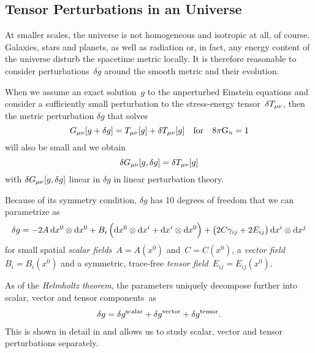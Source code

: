 \documentclass[12pt,parskip=half]{scrreprt}
\newcommand{\todocheck}[1]{\todo[color=blue!40]{#1}}
\begin{document}
\subsection{Tensor Perturbations in an \FLRW Universe}\label{sec:perturb}

At smaller scales, the universe is not homogeneous and isotropic at all, of course. Galaxies, stars and planets, as well as radiation or, in fact, any energy content of the universe disturb the spacetime metric locally. It is therefore reasonable to consider perturbations~\(\delta g\) around the smooth \FLRW metric and their evolution.

When we assume an exact solution~\(g\) to the unperturbed Einstein equations and consider a sufficiently small perturbation to the stress-energy tensor~\(\delta T_{\mu \nu}\), then the metric perturbation \(\delta g\) that solves
\begin{equation}
	G_{\mu \nu}[g + \delta g] = T_{\mu \nu}[g] + \delta T_{\mu \nu}[g] \quad \text{for} \quad 8 \pi \mathrm{G}_\textnormal{\tiny{N}} = 1
\end{equation}
will also be small  and we obtain
\begin{equation}\label{eq:perturbed_einstein_eqns}
	\delta G_{\mu \nu}[g,\delta g] = \delta T_{\mu \nu}[g]
\end{equation}
with \(\delta G_{\mu \nu}[g,\delta g]\) linear in \(\delta g\) in linear perturbation theory.

Because of its symmetry condition, \(\delta g\) has 10 degrees of freedom that we can parametrize as \citep{Schulz}
\begin{align}
	\delta g = -2A \dif{x^0}\otimes\dif{x^0} + B_i\del{\dif{x^0}\otimes\dif{x^i}+\dif{x^i}\otimes\dif{x^0}} + \del{2C\gamma_{ij} + 2E_{ij}}\dif{x^i}\otimes\dif{x^j}
\end{align}\todocheck{notation}
for small spatial \emph{scalar fields}~\(A=A(x^0)\) and~\(C=C(x^0)\), a \emph{vector field}~\(B_i=B_i(x^0)\) and a symmetric, trace-free \emph{tensor field}~\(E_{ij}=E_{ij}(x^0)\).

As of the \emph{Helmholtz theorem}, the parameters uniquely decompose further into scalar, vector and tensor components~as
\begin{align}
	\delta g = \delta g^{\mathrm{scalar}} + \delta g^{\mathrm{vector}} + \delta g^{\mathrm{tensor}} \mathpunct{.}
\end{align}
This is shown in detail in  and allows us to study scalar, vector and tensor perturbations separately. 
\end{document}
